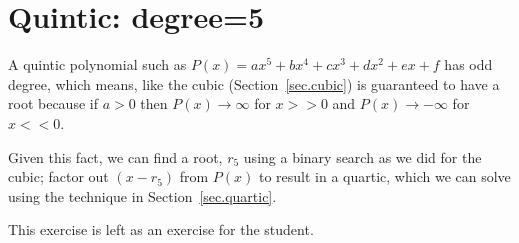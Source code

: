 \section{Quintic: degree=5}
\label{sec.quintic}

A quintic polynomial such as $P(x) = a x^5 + b x^4 + c x^3 + d x^2 + e x + f$ has odd degree,
which means, like the cubic (Section~\ref{sec.cubic}) is guaranteed to have a root because if
$a>0$ then $P(x)\to \infty$ for $x>>0$ and $P(x)\to -\infty$ for $x<<0$.

Given this fact, we can find a root, $r_5$ using a binary search as we did for the cubic;
factor out $(x-r_5)$ from $P(x)$ to result in a quartic, which we can solve using
the technique in Section~\ref{sec.quartic}.

This exercise is left as an exercise for the student.
